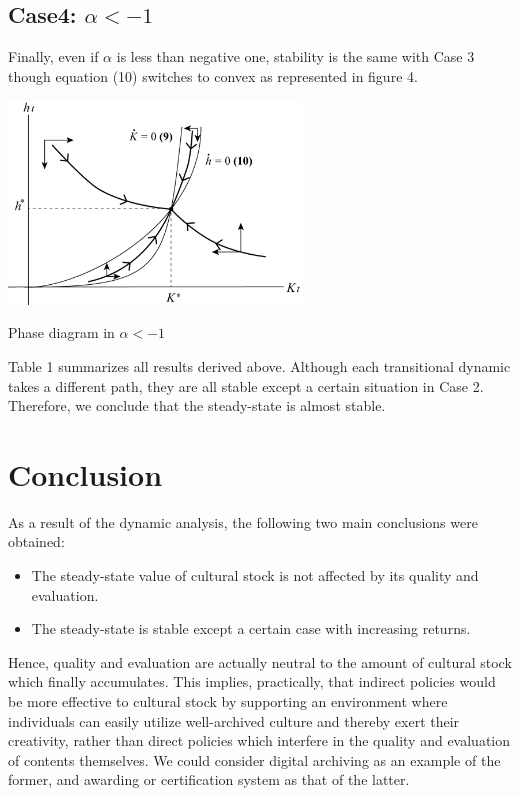 \documentclass{jsarticle}
\makeatletter
\newenvironment{figurehere}
  {\def\@captype{figure}}
  {}
\makeatother
\begin{document}
\subsection*{Case4: \mbox{\boldmath$\alpha<-1$}}
Finally, even if $\alpha$ is less than negative one, stability is the same with Case 3
though equation (10) switches to convex as represented in figure 4.\vspace{0.2in}

\begin{figurehere}
  \centering
  \includegraphics[width=7.8cm]{figure4_ex.png}
  \caption{Phase diagram in $\alpha<-1$}
  \label{Figure4}
\end{figurehere}

Table 1 summarizes all results derived above.
Although each transitional dynamic takes a different path, they are all stable except a certain situation in Case 2.
Therefore, we conclude that the steady-state is almost stable.

\section{Conclusion}

As a result of the dynamic analysis, the following two main conclusions were obtained:

\begin{itemize}
    \item The steady-state value of cultural stock is not affected by its quality and evaluation.
    \item The steady-state is stable except a certain case with increasing returns.
\end{itemize}

Hence, quality and evaluation are actually neutral to the amount of cultural stock which finally accumulates.
This implies, practically, that indirect policies would be more effective to cultural stock by supporting an environment where individuals can easily utilize well-archived culture and thereby exert their creativity, rather than direct policies which interfere in the quality and evaluation of contents themselves.
We could consider digital archiving as an example of the former, and awarding or certification system as that of the latter.
\end{document}
